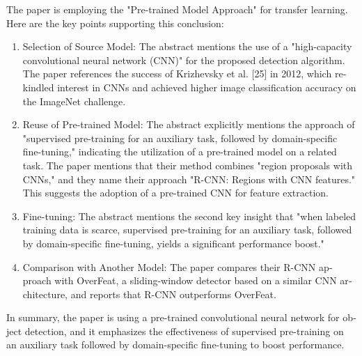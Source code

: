\documentclass{article}
\begin{document}
\begin{latin}
The paper is employing the "Pre-trained Model Approach" for transfer learning. Here are the key points supporting this conclusion:

\begin{enumerate}
    \item Selection of Source Model:
        The abstract mentions the use of a "high-capacity convolutional neural network (CNN)" for the proposed detection algorithm.
        The paper references the success of Krizhevsky et al. [25] in 2012, which rekindled interest in CNNs and achieved higher image classification accuracy on the ImageNet challenge.

    \item Reuse of Pre-trained Model:
        The abstract explicitly mentions the approach of "supervised pre-training for an auxiliary task, followed by domain-specific fine-tuning," indicating the utilization of a pre-trained model on a related task.
        The paper mentions that their method combines "region proposals with CNNs," and they name their approach "R-CNN: Regions with CNN features." This suggests the adoption of a pre-trained CNN for feature extraction.

    \item Fine-tuning:
        The abstract mentions the second key insight that "when labeled training data is scarce, supervised pre-training for an auxiliary task, followed by domain-specific fine-tuning, yields a significant performance boost."

    \item Comparison with Another Model:
        The paper compares their R-CNN approach with OverFeat, a sliding-window detector based on a similar CNN architecture, and reports that R-CNN outperforms OverFeat.
\end{enumerate}
In summary, the paper is using a pre-trained convolutional neural network for object detection, and it emphasizes the effectiveness of supervised pre-training on an auxiliary task followed by domain-specific fine-tuning to boost performance.
\end{latin}


\section{}
\end{document}

